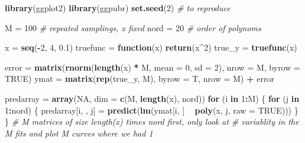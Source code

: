 \documentclass[]{article}
\newenvironment{Shaded}{\begin{snugshade}}{\end{snugshade}}
\newcommand{\KeywordTok}[1]{\textcolor[rgb]{0.13,0.29,0.53}{\textbf{#1}}}
\newcommand{\DataTypeTok}[1]{\textcolor[rgb]{0.13,0.29,0.53}{#1}}
\newcommand{\DecValTok}[1]{\textcolor[rgb]{0.00,0.00,0.81}{#1}}
\newcommand{\FloatTok}[1]{\textcolor[rgb]{0.00,0.00,0.81}{#1}}
\newcommand{\StringTok}[1]{\textcolor[rgb]{0.31,0.60,0.02}{#1}}
\newcommand{\CommentTok}[1]{\textcolor[rgb]{0.56,0.35,0.01}{\textit{#1}}}
\newcommand{\OtherTok}[1]{\textcolor[rgb]{0.56,0.35,0.01}{#1}}
\newcommand{\ControlFlowTok}[1]{\textcolor[rgb]{0.13,0.29,0.53}{\textbf{#1}}}
\newcommand{\OperatorTok}[1]{\textcolor[rgb]{0.81,0.36,0.00}{\textbf{#1}}}
\newcommand{\NormalTok}[1]{#1}
\begin{document}
\begin{Shaded}
\begin{Highlighting}[]
\KeywordTok{library}\NormalTok{(ggplot2)}
\KeywordTok{library}\NormalTok{(ggpubr)}
\KeywordTok{set.seed}\NormalTok{(}\DecValTok{2}\NormalTok{)  }\CommentTok{# to reproduce}

\NormalTok{M =}\StringTok{ }\DecValTok{100}  \CommentTok{# repeated samplings, x fixed }
\NormalTok{nord =}\StringTok{ }\DecValTok{20}  \CommentTok{# order of polynoms}


\NormalTok{x =}\StringTok{ }\KeywordTok{seq}\NormalTok{(}\OperatorTok{-}\DecValTok{2}\NormalTok{, }\DecValTok{4}\NormalTok{, }\FloatTok{0.1}\NormalTok{)}
\NormalTok{truefunc =}\StringTok{ }\ControlFlowTok{function}\NormalTok{(x) }\KeywordTok{return}\NormalTok{(x}\OperatorTok{^}\DecValTok{2}\NormalTok{)}
\NormalTok{true_y =}\StringTok{ }\KeywordTok{truefunc}\NormalTok{(x)}

\NormalTok{error =}\StringTok{ }\KeywordTok{matrix}\NormalTok{(}\KeywordTok{rnorm}\NormalTok{(}\KeywordTok{length}\NormalTok{(x) }\OperatorTok{*}\StringTok{ }\NormalTok{M, }\DataTypeTok{mean =} \DecValTok{0}\NormalTok{, }\DataTypeTok{sd =} \DecValTok{2}\NormalTok{), }\DataTypeTok{nrow =}\NormalTok{ M, }\DataTypeTok{byrow =} \OtherTok{TRUE}\NormalTok{)}
\NormalTok{ymat =}\StringTok{ }\KeywordTok{matrix}\NormalTok{(}\KeywordTok{rep}\NormalTok{(true_y, M), }\DataTypeTok{byrow =}\NormalTok{ T, }\DataTypeTok{nrow =}\NormalTok{ M) }\OperatorTok{+}\StringTok{ }\NormalTok{error}

\NormalTok{predarray =}\StringTok{ }\KeywordTok{array}\NormalTok{(}\OtherTok{NA}\NormalTok{, }\DataTypeTok{dim =} \KeywordTok{c}\NormalTok{(M, }\KeywordTok{length}\NormalTok{(x), nord))}
\ControlFlowTok{for}\NormalTok{ (i }\ControlFlowTok{in} \DecValTok{1}\OperatorTok{:}\NormalTok{M) \{}
    \ControlFlowTok{for}\NormalTok{ (j }\ControlFlowTok{in} \DecValTok{1}\OperatorTok{:}\NormalTok{nord) \{}
\NormalTok{        predarray[i, , j] =}\StringTok{ }\KeywordTok{predict}\NormalTok{(}\KeywordTok{lm}\NormalTok{(ymat[i, ] }\OperatorTok{~}\StringTok{ }\KeywordTok{poly}\NormalTok{(x, j, }\DataTypeTok{raw =} \OtherTok{TRUE}\NormalTok{)))}
\NormalTok{    \}}
\NormalTok{\}}
\CommentTok{# M matrices of size length(x) times nord first, only look at}
\CommentTok{# variablity in the M fits and plot M curves where we had 1}


\end{Highlighting}
\end{Shaded}
\end{document}
